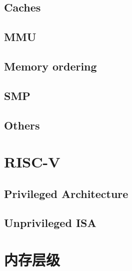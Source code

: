 %
%
%

\subsection{Caches}

\subsection{MMU}

\subsection{Memory ordering} \label{sec:memory-ordering}

\subsection{SMP}

\subsection{Others}

\section{RISC-V}

\subsection{Privileged Architecture}

\subsection{Unprivileged ISA}

\section{内存层级}

